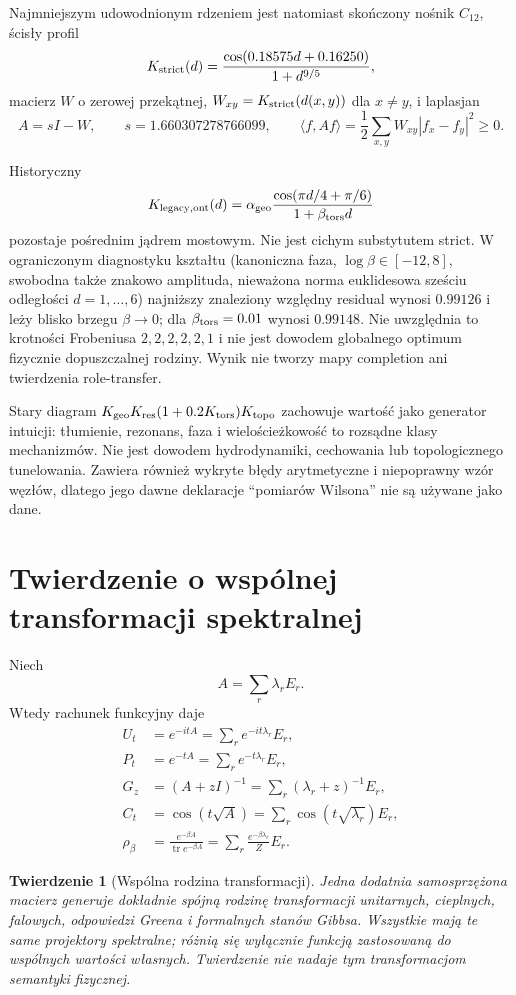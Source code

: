 \documentclass[11pt,a4paper]{article}
\newtheorem{theorem}{Twierdzenie}[section]
\begin{document}
Najmniejszym udowodnionym rdzeniem jest natomiast skończony nośnik $C_{12}$, ścisły profil
\[
K_{\rm strict}(d)=\frac{\cos(0.18575d+0.16250)}{1+d^{9/5}},
\]
macierz $W$ o zerowej przekątnej, $W_{xy}=K_{\rm strict}(d(x,y))$ dla $x\ne y$, i laplasjan
\[
A=sI-W,\qquad s=1.660307278766099,\qquad
\langle f,Af\rangle=\frac12\sum_{x,y}W_{xy}|f_x-f_y|^2\ge0.
\]

Historyczny
\[
K_{\rm legacy,ont}(d)=\alpha_{\rm geo}
\frac{\cos(\pi d/4+\pi/6)}{1+\beta_{\rm tors}d}
\]
pozostaje pośrednim jądrem mostowym. Nie jest cichym substytutem strict. W ograniczonym diagnostyku kształtu (kanoniczna faza, $\log\beta\in[-12,8]$, swobodna także znakowo amplituda, nieważona norma euklidesowa sześciu odległości $d=1,\ldots,6$) najniższy znaleziony względny residual wynosi $0.99126$ i leży blisko brzegu $\beta\to0$; dla $\beta_{\rm tors}=0.01$ wynosi $0.99148$. Nie uwzględnia to krotności Frobeniusa $2,2,2,2,2,1$ i nie jest dowodem globalnego optimum fizycznie dopuszczalnej rodziny. Wynik nie tworzy mapy completion ani twierdzenia role-transfer.

Stary diagram $K_{\rm geo}K_{\rm res}(1+0.2K_{\rm tors})K_{\rm topo}$ zachowuje wartość jako generator intuicji: tłumienie, rezonans, faza i wielościeżkowość to rozsądne klasy mechanizmów. Nie jest dowodem hydrodynamiki, cechowania lub topologicznego tunelowania. Zawiera również wykryte błędy arytmetyczne i niepoprawny wzór węzłów, dlatego jego dawne deklaracje ``pomiarów Wilsona'' nie są używane jako dane.

\section{Twierdzenie o wspólnej transformacji spektralnej}

Niech
\[
A=\sum_r\lambda_rE_r.
\]
Wtedy rachunek funkcyjny daje
\begin{align*}
U_t&=e^{-itA}=\sum_re^{-it\lambda_r}E_r,\\
P_t&=e^{-tA}=\sum_re^{-t\lambda_r}E_r,\\
G_z&=(A+zI)^{-1}=\sum_r(\lambda_r+z)^{-1}E_r,\\
C_t&=\cos(t\sqrt A)=\sum_r\cos(t\sqrt{\lambda_r})E_r,\\
\rho_\beta&=\frac{e^{-\beta A}}{\operatorname{tr}e^{-\beta A}}
=\sum_r\frac{e^{-\beta\lambda_r}}{Z}E_r.
\end{align*}

\begin{theorem}[Wspólna rodzina transformacji]
Jedna dodatnia samosprzężona macierz generuje dokładnie spójną rodzinę transformacji unitarnych, cieplnych, falowych, odpowiedzi Greena i formalnych stanów Gibbsa. Wszystkie mają te same projektory spektralne; różnią się wyłącznie funkcją zastosowaną do wspólnych wartości własnych. Twierdzenie nie nadaje tym transformacjom semantyki fizycznej.
\end{theorem}
\end{document}
